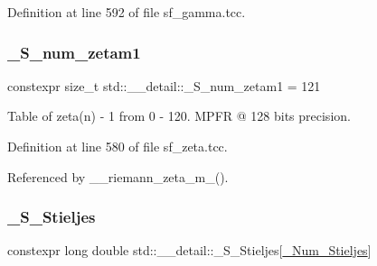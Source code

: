 Definition at line 592 of file sf\+\_\+gamma.\+tcc.

\mbox{\label{namespacestd_1_1____detail_a807e36c2aec3a9f27fdb21726cd464e2}} 
\subsubsection{\texorpdfstring{\+\_\+\+S\+\_\+num\+\_\+zetam1}{\_S\_num\_zetam1}}
{\footnotesize\ttfamily constexpr size\+\_\+t std\+::\+\_\+\+\_\+detail\+::\+\_\+\+S\+\_\+num\+\_\+zetam1 = 121}

Table of zeta(n) -\/ 1 from 0 -\/ 120. M\+P\+FR @ 128 bits precision. 

Definition at line 580 of file sf\+\_\+zeta.\+tcc.



Referenced by \+\_\+\+\_\+riemann\+\_\+zeta\+\_\+m\+\_().

\mbox{\label{namespacestd_1_1____detail_aca60d4f73c51098c997f11692bacbcfe}} 
\subsubsection{\texorpdfstring{\+\_\+\+S\+\_\+\+Stieljes}{\_S\_Stieljes}}
{\footnotesize\ttfamily constexpr long double std\+::\+\_\+\+\_\+detail\+::\+\_\+\+S\+\_\+\+Stieljes\mbox{[}\hyperlink{namespacestd_1_1____detail_ab80ca58ee274bce962adc6208bfe4e2d}{\+\_\+\+Num\+\_\+\+Stieljes}\mbox{]}}

